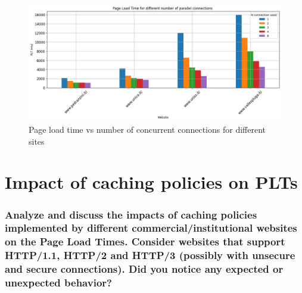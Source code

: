 \documentclass[eng]{class}
\begin{document}
\begin{figure}[H]
	\centering
	\includegraphics[width=0.8\columnwidth]{images/plt_vs_conc_1.1.png}
	\caption{Page load time vs number of concurrent connections for different sites}
	\label{fig-1}
\end{figure}

\pagestyle{OtherPage}
\section{Impact of caching policies on PLTs}
\subsubsection*{Analyze and discuss the impacts of caching policies implemented by different
	commercial/institutional websites on the Page Load Times. Consider websites that support
	HTTP/1.1, HTTP/2 and HTTP/3 (possibly with unsecure and secure connections). Did you notice
	any expected or unexpected behavior?}
\end{document}
